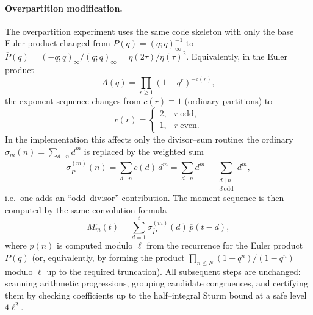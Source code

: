 \documentclass[11pt]{article}
\theoremstyle{definition}
\theoremstyle{remark}
\begin{document}
\paragraph{Overpartition modification.}
The overpartition experiment uses the same code skeleton with only the base
Euler product changed from
$P(q)=(q;q)_\infty^{-1}$ to
$\overline{P}(q)=(-q;q)_\infty/(q;q)_\infty=\eta(2\tau)/\eta(\tau)^2$.
Equivalently, in the Euler product
\[
A(q)=\prod_{r\ge1}(1-q^r)^{-c(r)},
\]
the exponent sequence changes from $c(r)\equiv 1$ (ordinary partitions) to
\[
c(r)=
\begin{cases}
2,& r\ \text{odd},\\
1,& r\ \text{even}.
\end{cases}
\]
In the implementation this affects only the divisor--sum routine: the ordinary
$\sigma_m(n)=\sum_{d\mid n}d^m$ is replaced by the weighted sum
\[
\sigma^{(m)}_{\overline{P}}(n)=\sum_{d\mid n}c(d)\,d^m
=\sum_{d\mid n}d^m+\sum_{\substack{d\mid n\\ d\ \text{odd}}}d^m,
\]
i.e.\ one adds an ``odd--divisor'' contribution.
The moment sequence is then computed by the same convolution formula
\[
M_m^{\overline{\ }}(t)=\sum_{d=1}^{t}\sigma^{(m)}_{\overline{P}}(d)\,
\overline{p}(t-d),
\]
where $\overline{p}(n)$ is computed modulo $\ell$ from the recurrence for the
Euler product $\overline{P}(q)$ (or, equivalently, by forming the product
$\prod_{n\le N}(1+q^n)/(1-q^n)$ modulo $\ell$ up to the required truncation).
All subsequent steps are unchanged: scanning arithmetic progressions,
grouping candidate congruences, and certifying them by checking coefficients up
to the half--integral Sturm bound at a safe level $4\ell^2$.
\end{document}
